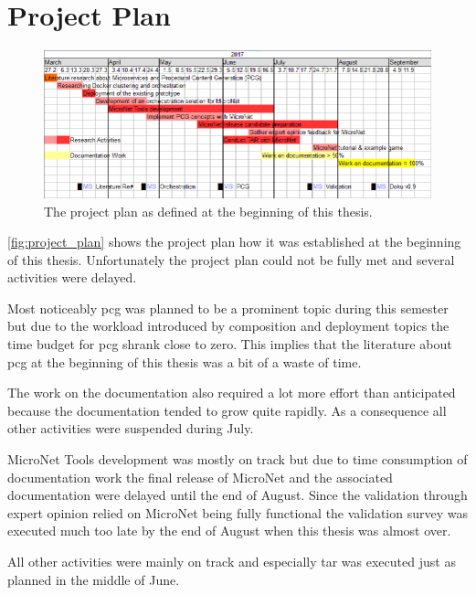 \chapter{Project Plan}

\begin{figure}[H]
	\hspace*{-1.6cm}
  	\centering
  	\includegraphics[width=1.2\textwidth]{images/ProjectPlan}
  	\caption{The project plan as defined at the beginning of this thesis.}
  	\label{fig:project_plan}
\end{figure}


\autoref{fig:project_plan} shows the project plan how it was established at the
beginning of this thesis. Unfortunately the project plan could not be fully met
and several activities were delayed.

Most noticeably \gls{pcg} was planned to be a prominent topic during this semester but
due to the workload introduced by composition and deployment topics the time
budget for \gls{pcg} shrank close to zero. This implies that the literature
about \gls{pcg} at the beginning of this thesis was a bit of a waste of time.

The work on the documentation also required a lot more effort than anticipated
because the documentation tended to grow quite rapidly. As a consequence all
other activities were suspended during July.

MicroNet Tools development was mostly on track but due to time consumption of
documentation work the final release of MicroNet and the associated
documentation were delayed until the end of August. Since the validation through
expert opinion relied on MicroNet being fully functional the validation survey
was executed much too late by the end of August when this thesis was almost
over.

All other activities were mainly on track and especially \gls{tar} was executed
just as planned in the middle of June.  
